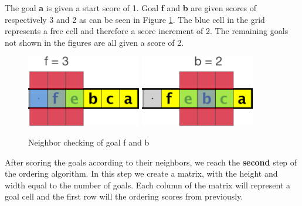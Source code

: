 The goal \textbf{a} is given a start score of 1. Goal \textbf{f} and \textbf{b} are given scores of respectively 3 and 2 as can be seen in Figure \ref{fig:grid2}. The blue cell in the grid represents a free cell and therefore a score increment of 2. The remaining goals not shown in the figures are all given a score of 2. 

\begin{figure}[ht!]
\centering
\includegraphics[width=50mm]{graphics/goal_pri_3.png}
\break
\includegraphics[width=50mm]{graphics/goal_pri_2.png}
\caption{Neighbor checking of goal f and b\label{fig:grid2}}
\end{figure}

After scoring the goals according to their neighbors, we reach the \textbf{second} step of the ordering algorithm. In this step we create a matrix, with the height and width equal to the number of goals. Each column of the matrix will represent a goal cell and the first row will the ordering scores from previously. 

